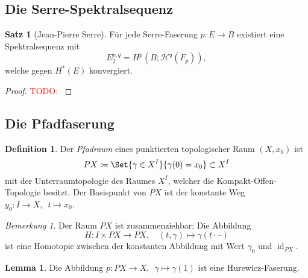\documentclass[11pt, a4paper, german]{article}
\theoremstyle{definition}
\newtheorem*{satz}{Satz}
\newtheorem*{lem}{Lemma}
\newtheorem*{defn}{Definition}
\theoremstyle{remark}
\newtheorem*{bem}{Bemerkung}
\newcommand{\TODO}[1]{\textcolor{red}{TODO: #1}} %
\DeclareMathOperator{\id}{id} %
\newcommand{\blank}{\text{--}} %
\newcommand{\LH}{\mathcal{H}} %
\newcommand{\I}{I} %
\begin{document}
\subsection{Die Serre-Spektralsequenz}

\begin{satz}[Jean-Pierre Serre]
  Für jede Serre-Faserung $p : E \to B$ existiert eine Spektralsequenz mit
  \[ E_2^{p,q} = H^p(B; \LH^q(F_p)), \]
  welche gegen $H^*(E)$ konvergiert.
\end{satz}

\begin{proof}
  \TODO{}
\end{proof}


\subsection{Die Pfadfaserung}

\begin{defn}
  Der \emph{Pfadraum} eines punktierten topologischer Raum $(X, x_0)$ ist
  \[ PX \coloneqq \Set{\gamma \in X^\I}{\gamma(0) = x_0} \subset X^I \]
  mit der Unterraumtopologie des Raumes $X^I$, welcher die Kompakt-Offen-Topologie besitzt.
  Der Basispunkt von $PX$ ist der konstante Weg $y_0 : \I \to X, \enspace t \mapsto x_0$.
\end{defn}

\begin{bem}
  Der Raum $PX$ ist zusammenziehbar: Die Abbildung
  \[
    H : \I \times PX \to PX, \quad
    (t, \gamma) \mapsto \gamma(t \cdot \blank)
  \]
  ist eine Homotopie zwischen der konstanten Abbildung mit Wert $\gamma_0$ und $\id_{PX}$.
\end{bem}

\begin{lem}
  Die Abbildung
  $
    p : PX \to X, \enspace
    \gamma \mapsto \gamma(1)
  $
  ist eine Hurewicz-Faserung.
\end{lem}
\end{document}
